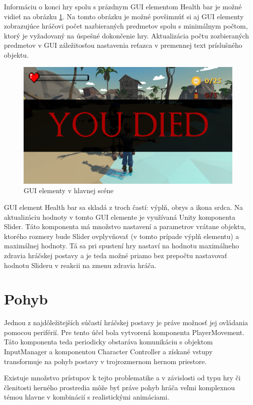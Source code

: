 \documentclass[slovak, master]{diploma}
\begin{document}
Informáciu o konci hry spolu s prázdnym GUI elementom Health bar je možné vidieť na obrázku \ref{pic:YouDied}. Na tomto obrázku je možné povšimnúť si aj GUI elementy zobrazujúce hráčovi počet nazbieraných predmetov spolu s minimálnym počtom, ktorý je vyžadovaný na úspešné dokončenie hry. Aktualizácia počtu zozbieraných predmetov v GUI záležitosťou nastavenia reťazca v premennej text príslušného objektu. 

\begin{figure}[!htbp]
	\centering
	\includegraphics[width=.8\textwidth]{Figures/youDied.png}
	\caption{GUI elementy v hlavnej scéne}
	\label{pic:YouDied}
\end{figure}

GUI element Health bar sa skladá z troch častí: výplň, obrys a ikona srdca. Na aktualizáciu hodnoty v tomto GUI elemente je využívaná Unity komponenta Slider. Táto komponenta má množstvo nastavení a parametrov vrátane objektu, ktorého rozmery bude Slider ovplyvňovať (v tomto prípade výplň elementu) a maximálnej hodnoty. Tá sa pri spustení hry nastaví na hodnotu maximálneho zdravia hráčskej postavy a je teda možné priamo bez prepočtu nastavovať hodnotu Slideru v reakcii na zmenu zdravia hráča.

\section{Pohyb}
\label{sec:PlayerMovement} 
Jednou z najdôležitejších súčastí hráčskej postavy je práve možnosť jej ovládania pomocou periférií. Pre tento účel bola vytvorená komponenta PlayerMovement. Táto komponenta teda periodicky obstaráva komunikáciu s objektom InputManager a komponentou Character Controller a získané vstupy transformuje na pohyb postavy v trojrozmernom hernom priestore.

Existuje množstvo prístupov k tejto problematike a v závislosti od typu hry či členitosti herného prostredia môže byť práve pohyb hráča veľmi komplexnou témou hlavne v kombinácií s realistickými animáciami.
\end{document}
